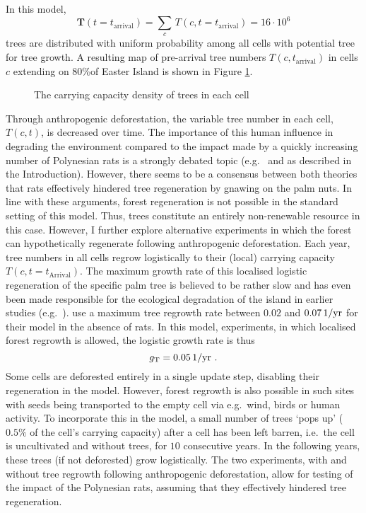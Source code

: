 In this model, 
\begin{equation}
\mathbf{T}(t=t_\text{arrival}) = \sum_{c} \, T(c,t=t_\text{arrival}) =  16 \cdot 10^6
\end{equation} 
trees are distributed with uniform probability among all cells with potential tree for tree growth. 
A resulting map of pre-arrival tree numbers $T(c,t_\text{arrival})$ in cells $c$ extending on $80\%$\TODO of Easter Island is shown in Figure \ref{fig:Map_tree}.

\begin{figure}
	\centering
	\caption{The carrying capacity density of trees in each cell}
	\label{fig:Map_tree}
\end{figure}

Through anthropogenic deforestation, the variable tree number in each cell, $T(c,t)$, is decreased over time.
The importance of this human influence in degrading the environment compared to the impact made by a quickly increasing number of Polynesian rats is a strongly debated topic (e.g.\ \citet{Bahn2017} and \citet{Hunt2007} as described in the Introduction).
However, there seems to be a consensus between both theories that rats effectively hindered tree regeneration by gnawing on the palm nuts.
In line with these arguments, forest regeneration is not possible in the standard setting of this model.
Thus, trees constitute an entirely non-renewable resource in this case. 
However, I further explore alternative experiments in which the forest can hypothetically regenerate following anthropogenic deforestation.
Each year, tree numbers in all cells regrow logistically to their (local) carrying capacity $T(c,t=t_\text{Arrival})$.
The maximum growth rate of this localised logistic regeneration of the specific palm tree is believed to be rather slow and has even been made responsible for the ecological degradation of the island in earlier studies (e.g.\ \citet{Brander1998}).
\citet{Brandt2015} use a maximum tree regrowth rate between $0.02$ and $0.07 \, \rm{1/yr}$ for their model in the absence of rats.\TODO
In this model, experiments, in which localised forest regrowth is allowed, the logistic growth rate is thus 
\begin{equation}
g_{\rm T} = 0.05\, \rm{1/yr} \ .
\end{equation}
Some cells are deforested entirely in a single update step, disabling their regeneration in the model. 
However, forest regrowth is also possible in such sites with seeds being transported to the empty cell via e.g.\ wind, birds or human activity.
To incorporate this in the model, a small number of trees `pops up' ($0.5\%$ of the cell's carrying capacity) after a cell has been left barren, i.e.\ the cell is uncultivated and without trees, for $10$ consecutive years.  
In the following years, these trees (if not deforested) grow logistically.
The two experiments, with and without tree regrowth following anthropogenic deforestation, allow for testing of the impact of the Polynesian rats, assuming that they effectively hindered tree regeneration.

